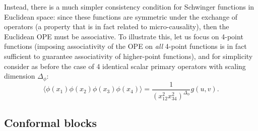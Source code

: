 \documentclass[a4paper,12pt]{article}
\numberwithin{equation}{section}
\begin{document}
Instead, there is a much simpler consistency condition for Schwinger functions in Euclidean space: since these functions are symmetric under the exchange of operators (a property that is in fact related to micro-causality), then the Euclidean OPE must be associative. To illustrate this, let us focus on 4-point functions (imposing associativity of the OPE on \emph{all} 4-point functions is in fact sufficient to guarantee associativity of higher-point functions), and for simplicity consider as before the case of 4 identical scalar primary operators with scaling dimension $\Delta_\phi$:
\begin{equation}
	\langle \phi(x_1) \phi(x_2) \phi(x_3) \phi(x_4) \rangle
	= \frac{1}{(x_{12}^2 x_{34}^2)^{\Delta_\phi}}
	g(u, v).
	\label{eq:4pt:repeated}
\end{equation}


\subsection{Conformal blocks}
\end{document}
